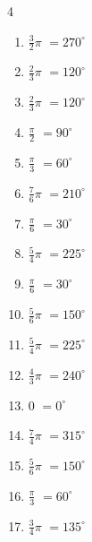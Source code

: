 \begin{multicols}{4}
\begin{enumerate}
  \item $\displaystyle \frac{3}{2}\pi$
        $\displaystyle =270^{\circ}$

  \item $\displaystyle \frac{2}{3}\pi$
        $\displaystyle =120^{\circ}$

\columnbreak %

  \item $\displaystyle \frac{2}{3}\pi$
        $\displaystyle =120^{\circ}$

  \item $\displaystyle \frac{\pi}{2}$
        $\displaystyle =90^{\circ}$

  \item $\displaystyle \frac{\pi}{3}$
        $\displaystyle =60^{\circ}$

  \item $\displaystyle \frac{7}{6}\pi$
        $\displaystyle =210^{\circ}$

  \item $\displaystyle \frac{\pi}{6}$
        $\displaystyle =30^{\circ}$

  \item $\displaystyle \frac{5}{4}\pi$
        $\displaystyle =225^{\circ}$

  \item $\displaystyle \frac{\pi}{6}$
        $\displaystyle =30^{\circ}$

  \item $\displaystyle \frac{5}{6}\pi$
        $\displaystyle =150^{\circ}$

  \item $\displaystyle \frac{5}{4}\pi$
        $\displaystyle =225^{\circ}$

  \item $\displaystyle \frac{4}{3}\pi$
        $\displaystyle =240^{\circ}$

  \item $\displaystyle 0$
        $\displaystyle =0^{\circ}$

  \item $\displaystyle \frac{7}{4}\pi$
        $\displaystyle =315^{\circ}$

  \item $\displaystyle \frac{5}{6}\pi$
        $\displaystyle =150^{\circ}$

  \item $\displaystyle \frac{\pi}{3}$
        $\displaystyle =60^{\circ}$

  \item $\displaystyle \frac{3}{4}\pi$
        $\displaystyle =135^{\circ}$


\end{enumerate}
\end{multicols}
